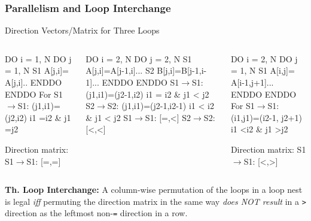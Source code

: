 \documentclass[rgb,dvipsnames]{beamer}
\newcommand{\emp}[1]{\textcolor{DikuRed}{ #1}}
\newcommand{\mymath}[1]{$ #1 $}
\begin{document}
\begin{frame}[fragile,t]
  \frametitle{Parallelism and Loop Interchange} %

\begin{block}{Direction Vectors/Matrix for Three Loops }
\begin{columns}
\begin{colorcode}
  DO i = 1, N
    DO j = 1, N
S1    A[j,i]=
       A[j,i]..
    ENDDO
  ENDDO
For S1\mymath{\rightarrow}S1: 
 (j1,i1)=(j2,i2) 
 i1\emp{=}i2 \& j1\emp{=}j2

Direction matrix:
S1\mymath{\rightarrow}S1: \emp{[=,=]}
\end{colorcode}
\begin{colorcode}
  DO i = 2, N
   DO j = 2, N
S1  A[j,i]=A[j-1,i]...
S2  B[j,i]=B[j-1,i-1]...
   ENDDO
  ENDDO
S1\mymath{\rightarrow}S1: (j1,i1)=(j2-1,i2)
        i1 \emp{=} i2 \& j1 \emp{<} j2
S2\mymath{\rightarrow}S2: (j1,i1)=(j2-1,i2-1)
        i1 \emp{<} i2 \& j1 \emp{<} j2
S1\mymath{\rightarrow}S1: \emp{[=,<]}
S2\mymath{\rightarrow}S2: \emp{[<,<]}
\end{colorcode}
\begin{colorcode}
  DO i = 2, N
   DO j = 1, N
S1  A[i,j]=
     A[i-1,j+1]...
   ENDDO
  ENDDO
For S1\mymath{\rightarrow}S1:
 (i1,j1)=(i2-1,
          j2+1)
 i1\emp{<}i2 \& j1\emp{>}j2

Direction matrix:
S1\mymath{\rightarrow}S1: \emp{[<,>]}
\end{colorcode}
\end{columns}
\end{block} 

{\bf Th. Loop Interchange:} A column-wise permutation of the loops in a loop nest 
is legal {\em iff} permuting the direction matrix in the same way {\em does NOT result}
in a {\tt >} direction as the leftmost non-{\tt{}=} direction in a row. 

\end{frame}
\end{document}
